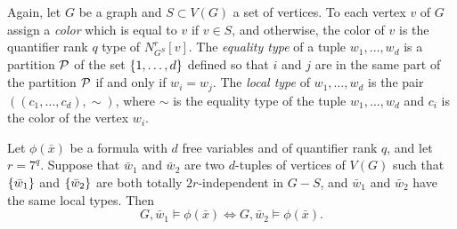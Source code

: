 Again, let $G$ be a graph and  $S\subset V(G)$ a set of vertices.
To each  vertex $v$ of $G$ 
assign a \emph{color} which is equal to $v$ if $v\in S$,
and otherwise, the color of $v$ is the quantifier rank $q$ type of  $N^r_{G^S}[v]$.
The \emph{equality type} of a tuple $w_1,\ldots,w_d$
is a partition $\cal P$ of the set $\set{1,\ldots,d}$
defined so that $i$ and $j$ are in the same part of the partition $\cal P$ if and only if $w_i=w_j$.
The \emph{local type} of $w_1,\ldots,w_d$
is the pair $((c_1,\ldots,c_d),\sim)$,
where $\sim$ is the equality type of the tuple $w_1,\ldots,w_d$
and $c_i$ is the color of the vertex $w_i$.



\begin{lemma}\label{lem:coloring}
	Let $\phi(\bar x)$ be a formula with
	 $d$ free variables and of quantifier rank $q$, and let $r=7^q$.
	Suppose that $\bar w_1$ and $\bar w_2$ are two  $d$-tuples of 
	vertices of $V(G)$ such that $\set{\bar w_1}$ and $\set{\bar w_2}$ are both totally $2r$-independent in $G-S$, and  $\bar w_1$ and $\bar w_2$ have the same local types. Then $$G,\bar w_1\models \phi(\bar x)\iff G,\bar w_2\models \phi(\bar x).$$
\end{lemma}

